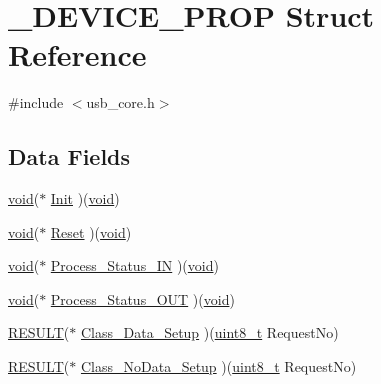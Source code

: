 \hypertarget{struct___d_e_v_i_c_e___p_r_o_p}{\section{\-\_\-\-D\-E\-V\-I\-C\-E\-\_\-\-P\-R\-O\-P Struct Reference}
\label{struct___d_e_v_i_c_e___p_r_o_p}
}


{\ttfamily \#include $<$usb\-\_\-core.\-h$>$}

\subsection*{Data Fields}
\begin{DoxyCompactItemize}
\item 
\hyperlink{group___n_a_m_e_ga18028b8badbf1ea7e704ccac3c488e82}{void}($\ast$ \hyperlink{struct___d_e_v_i_c_e___p_r_o_p_a04c59669debabd18caa5a474d4d702f8}{Init} )(\hyperlink{group___n_a_m_e_ga18028b8badbf1ea7e704ccac3c488e82}{void})
\item 
\hyperlink{group___n_a_m_e_ga18028b8badbf1ea7e704ccac3c488e82}{void}($\ast$ \hyperlink{struct___d_e_v_i_c_e___p_r_o_p_ae216d202b4b5d5874a79d84051c1fca7}{Reset} )(\hyperlink{group___n_a_m_e_ga18028b8badbf1ea7e704ccac3c488e82}{void})
\item 
\hyperlink{group___n_a_m_e_ga18028b8badbf1ea7e704ccac3c488e82}{void}($\ast$ \hyperlink{struct___d_e_v_i_c_e___p_r_o_p_ad5b7f1d4c7f5850dbb6122e11d36f03d}{Process\-\_\-\-Status\-\_\-\-I\-N} )(\hyperlink{group___n_a_m_e_ga18028b8badbf1ea7e704ccac3c488e82}{void})
\item 
\hyperlink{group___n_a_m_e_ga18028b8badbf1ea7e704ccac3c488e82}{void}($\ast$ \hyperlink{struct___d_e_v_i_c_e___p_r_o_p_abce960001781eb542f0fec560480a8c1}{Process\-\_\-\-Status\-\_\-\-O\-U\-T} )(\hyperlink{group___n_a_m_e_ga18028b8badbf1ea7e704ccac3c488e82}{void})
\item 
\hyperlink{_s_t_m32_f10x_2_libraries_2_s_t_m32___u_s_b-_f_s-_device___driver_2inc_2usb__core_8h_ac0c5cc7751807fb0264baeab942bc8c3}{R\-E\-S\-U\-L\-T}($\ast$ \hyperlink{struct___d_e_v_i_c_e___p_r_o_p_af65be70e4aa9f3835340420c1efcd518}{Class\-\_\-\-Data\-\_\-\-Setup} )(\hyperlink{stdint_8h_aba7bc1797add20fe3efdf37ced1182c5}{uint8\-\_\-t} Request\-No)
\item 
\hyperlink{_s_t_m32_f10x_2_libraries_2_s_t_m32___u_s_b-_f_s-_device___driver_2inc_2usb__core_8h_ac0c5cc7751807fb0264baeab942bc8c3}{R\-E\-S\-U\-L\-T}($\ast$ \hyperlink{struct___d_e_v_i_c_e___p_r_o_p_a5417989d09b2bcba14ea5116f663a306}{Class\-\_\-\-No\-Data\-\_\-\-Setup} )(\hyperlink{stdint_8h_aba7bc1797add20fe3efdf37ced1182c5}{uint8\-\_\-t} Request\-No)

\end{DoxyCompactItemize}
